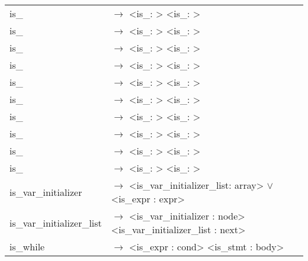 \documentclass[a4paper]{article}
\begin{document}
\begin{tabular}{ll}
	is\_ & $\to$ <is\_: > <is\_: > \\
	is\_ & $\to$ <is\_: > <is\_: > \\
	is\_ & $\to$ <is\_: > <is\_: > \\
	is\_ & $\to$ <is\_: > <is\_: > \\
	is\_ & $\to$ <is\_: > <is\_: > \\
	is\_ & $\to$ <is\_: > <is\_: > \\
	is\_ & $\to$ <is\_: > <is\_: > \\
	is\_ & $\to$ <is\_: > <is\_: > \\
	is\_ & $\to$ <is\_: > <is\_: > \\
	is\_ & $\to$ <is\_: > <is\_: > \\
\begin{comment}

\end{comment}

\begin{comment}
==================================================== SEPARATOR ====================================================
\end{comment}

	is\_var\_initializer 					& $\to$ <is\_var\_initializer\_list: array> $\vee$ <is\_expr : expr> \\
	is\_var\_initializer\_list				& $\to$ <is\_var\_initializer : node> <is\_var\_initializer\_list : next> \\
	is\_while 								& $\to$ <is\_expr : cond> <is\_stmt : body> \\
\end{tabular}
\end{document}
